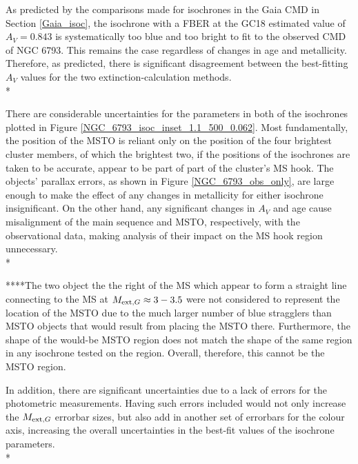 \documentclass[12pt, a4paper]{report}
\begin{document}
As predicted by the comparisons made for isochrones in the Gaia CMD in Section \ref{Gaia_isoc}, the isochrone with a FBER at the GC18 estimated value of $A_{V} = 0.843$ is systematically too blue and too bright to fit to the observed CMD of NGC 6793. This remains the case regardless of changes in age and metallicity. Therefore, as predicted, there is significant disagreement between the best-fitting $A_{V}$ values for the two extinction-calculation methods.\\*

There are considerable uncertainties for the parameters in both of the isochrones plotted in Figure \ref{NGC_6793_isoc_inset_1.1_500_0.062}. Most fundamentally, the position of the MSTO is reliant only on the position of the four brightest cluster members, of which the brightest two, if the positions of the isochrones are taken to be accurate, appear to be part of part of the cluster's MS hook. The objects' parallax errors, as shown in Figure \ref{NGC_6793_obs_only}, are large enough to make the effect of any changes in metallicity for either isochrone insignificant. On the other hand, any significant changes in $A_{V}$ and age cause misalignment of the main sequence and MSTO, respectively, with the observational data, making analysis of their impact on the MS hook region unnecessary.\\*


****The two object the the right of the MS which appear to form a straight line connecting to the MS at $M_{\textnormal{ext},G} \approx 3-3.5$ were not considered to represent the location of the MSTO due to the much larger number of blue stragglers than MSTO objects that would result from placing the MSTO there. Furthermore, the shape of the would-be MSTO region does not match the shape of the same region in any isochrone tested on the region. Overall, therefore, this cannot be the MSTO region.

In addition, there are significant uncertainties due to a lack of errors for the photometric measurements. Having such errors included would not only increase the $M_{\textnormal{ext},G}$ errorbar sizes, but also add in another set of errorbars for the colour axis, increasing the overall uncertainties in the best-fit values of the isochrone parameters. \\*
\end{document}

